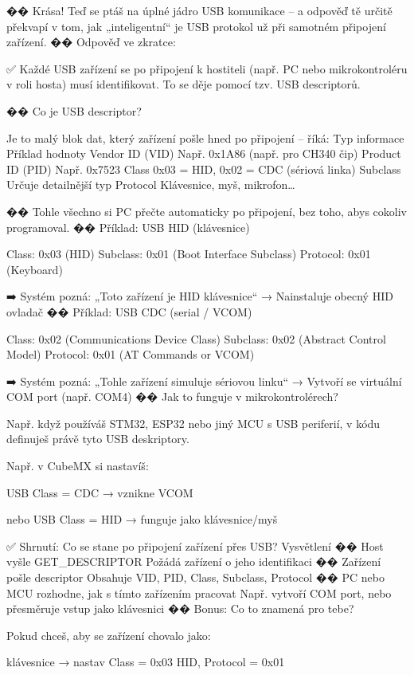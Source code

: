 �� Krása! Teď se ptáš na úplné jádro USB komunikace – a odpověď tě určitě překvapí v tom, jak „inteligentní“ je USB protokol už při samotném připojení zařízení.
�� Odpověď ve zkratce:

    ✅ Každé USB zařízení se po připojení k hostiteli (např. PC nebo mikrokontroléru v roli hosta) musí identifikovat.
    To se děje pomocí tzv. USB descriptorů.

�� Co je USB descriptor?

Je to malý blok dat, který zařízení pošle hned po připojení – říká:
Typ informace	Příklad hodnoty
Vendor ID (VID)	Např. 0x1A86 (např. pro CH340 čip)
Product ID (PID)	Např. 0x7523
Class	0x03 = HID, 0x02 = CDC (sériová linka)
Subclass	Určuje detailnější typ
Protocol	Klávesnice, myš, mikrofon…

�� Tohle všechno si PC přečte automaticky po připojení, bez toho, abys cokoliv programoval.
�� Příklad: USB HID (klávesnice)

Class:     0x03  (HID)
Subclass:  0x01  (Boot Interface Subclass)
Protocol:  0x01  (Keyboard)

➡️ Systém pozná: „Toto zařízení je HID klávesnice“
→ Nainstaluje obecný HID ovladač
�� Příklad: USB CDC (serial / VCOM)

Class:     0x02  (Communications Device Class)
Subclass:  0x02  (Abstract Control Model)
Protocol:  0x01  (AT Commands or VCOM)

➡️ Systém pozná: „Tohle zařízení simuluje sériovou linku“
→ Vytvoří se virtuální COM port (např. COM4)
�� Jak to funguje v mikrokontrolérech?

Např. když používáš STM32, ESP32 nebo jiný MCU s USB periferií, v kódu definuješ právě tyto USB deskriptory.

Např. v CubeMX si nastavíš:

    USB Class = CDC → vznikne VCOM

    nebo USB Class = HID → funguje jako klávesnice/myš

✅ Shrnutí:
Co se stane po připojení zařízení přes USB?	Vysvětlení
�� Host vyšle GET_DESCRIPTOR	Požádá zařízení o jeho identifikaci
�� Zařízení pošle descriptor	Obsahuje VID, PID, Class, Subclass, Protocol
�� PC nebo MCU rozhodne, jak s tímto zařízením pracovat	Např. vytvoří COM port, nebo přesměruje vstup jako klávesnici
�� Bonus: Co to znamená pro tebe?

Pokud chceš, aby se zařízení chovalo jako:

    klávesnice → nastav Class = 0x03 HID, Protocol = 0x01

